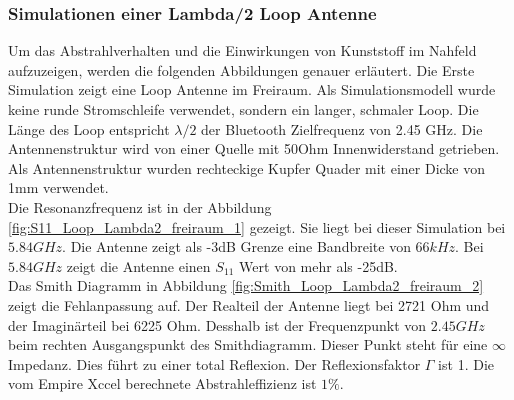 \subsubsection{Simulationen einer Lambda/2 Loop Antenne}\label{sec:SimL2Loop}
Um das Abstrahlverhalten und die Einwirkungen von Kunststoff im Nahfeld aufzuzeigen, werden die folgenden Abbildungen genauer erläutert.
Die Erste Simulation zeigt eine Loop Antenne im Freiraum. Als Simulationsmodell wurde keine runde Stromschleife verwendet, sondern ein langer, schmaler Loop. Die Länge des Loop entspricht $\lambda/2$ der Bluetooth Zielfrequenz von 2.45 GHz. Die Antennenstruktur wird von einer Quelle mit 50Ohm Innenwiderstand getrieben. Als Antennenstruktur wurden  rechteckige Kupfer Quader mit einer Dicke von 1mm verwendet. \\
Die Resonanzfrequenz ist in der Abbildung  \ref{fig:S11_Loop_Lambda2_freiraum_1} gezeigt. Sie liegt bei dieser Simulation bei $5.84 GHz$. Die Antenne zeigt als -3dB Grenze eine Bandbreite von $66kHz$. Bei $5.84 GHz$ zeigt die Antenne einen $S_{11}$ Wert von mehr als -25dB.\\
Das Smith Diagramm in  Abbildung \ref{fig:Smith_Loop_Lambda2_freiraum_2} zeigt die Fehlanpassung auf. Der Realteil der Antenne liegt bei 2721 Ohm und der Imaginärteil bei 6225 Ohm. Desshalb ist der Frequenzpunkt von $2.45 GHz$ beim rechten Ausgangspunkt des Smithdiagramm. Dieser Punkt steht für eine $\infty$ Impedanz. Dies führt zu einer total Reflexion. Der Reflexionsfaktor $\Gamma$ ist 1. Die vom Empire Xccel berechnete Abstrahleffizienz ist $1\%$.



